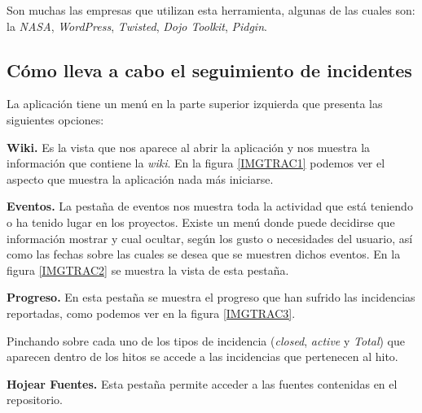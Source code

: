 \documentclass[11pt,a4paper,spanish,twoside]{report}
\begin{document}
        Son muchas las empresas que utilizan esta herramienta, algunas de las
        cuales son: la \emph{NASA}, \emph{WordPress}, \emph{Twisted},
        \emph{Dojo Toolkit}, \emph{Pidgin}. 

	\subsection{Cómo lleva a cabo el seguimiento de incidentes}

        La aplicación tiene un menú en la parte superior izquierda que
        presenta las siguientes opciones:
        \begin{description}
          \item \textbf{Wiki.} Es la vista que nos aparece al abrir
            la aplicación y nos muestra la información que contiene la
            \emph{wiki}. En la figura \ref{IMGTRAC1} podemos ver el aspecto
            que muestra la aplicación nada más iniciarse.


          \item \textbf{Eventos.} La pestaña de eventos nos muestra toda la
            actividad que está teniendo o ha tenido lugar en los
            proyectos. Existe un menú donde puede decidirse que información
            mostrar y cual ocultar, según los gusto o necesidades del
            usuario, así como las fechas sobre las cuales se desea que se
            muestren dichos eventos. En la figura \ref{IMGTRAC2} se muestra la
            vista de esta pestaña.


          \item \textbf{Progreso.} En esta pestaña se muestra el progreso que
            han sufrido las incidencias reportadas, como podemos ver en la
            figura \ref{IMGTRAC3}. 

            
            Pinchando sobre cada uno de los tipos de incidencia
            (\emph{closed}, \emph{active} y \emph{Total}) que aparecen dentro
            de los hitos se accede a las incidencias que pertenecen al hito.

          \item \textbf{Hojear Fuentes.} Esta pestaña permite acceder a las
            fuentes contenidas en el repositorio.


\end{description}
\end{document}
